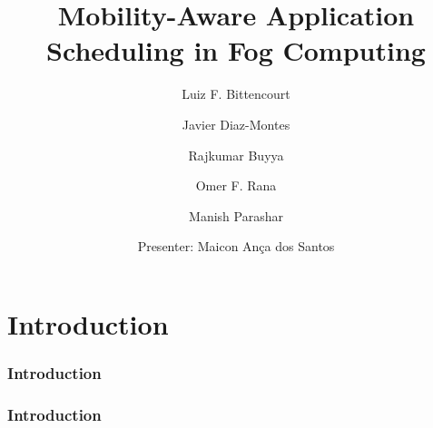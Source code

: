 \documentclass[10pt, pdf, xcolor=pdftex, dvipsnames, table]{beamer}
\title{Mobility-Aware Application Scheduling in Fog Computing}
\author{Luiz F. Bittencourt %
\and Javier Diaz-Montes %
\and Rajkumar Buyya %
\and Omer F. Rana
\and Manish Parashar
\newline
\newline
\and Presenter: Maicon Ança dos Santos
}
\begin{document}
\frame{\titlepage}



\section[Introduction]{Introduction}


\begin{frame}
	\frametitle{Introduction}
\end{frame}

\begin{frame}
	\frametitle{Introduction}
\end{frame}
\end{document}
